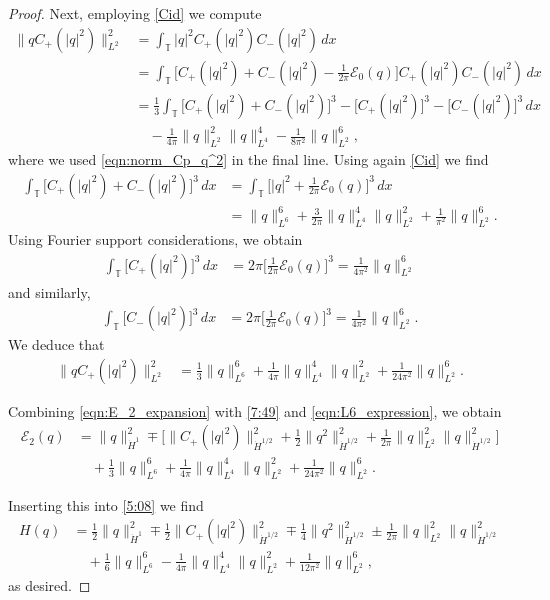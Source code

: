 \documentclass{amsart}
\numberwithin{equation}{section}
\theoremstyle{definition}
\newcommand{\T}{\mathbb{T}}
\begin{document}
\begin{proof}
Next, employing \eqref{Cid} we compute
\begin{align*}
\|q C_+(|q|^2)\|^2_{L^2}
&=\int_\T |q|^2 C_+(|q|^2)C_-(|q|^2)\,dx\\
&=\int_\T  \bigl[C_+(|q|^2)+C_-(|q|^2) -\tfrac1{2\pi} \mathcal{E}_0(q)\bigr]C_+(|q|^2)C_-(|q|^2)\,dx\\
&=\tfrac{1}{3}\int_\T\bigl[C_+(|q|^2)+C_-(|q|^2)\bigr]^3-\bigl[ C_+(|q|^2)\bigr]^3-\bigl[C_-(|q|^2)\bigr]^3\,dx\\
&\quad-\tfrac1{4\pi}\|q\|_{L^2}^2\|q\|_{L^4}^4-\tfrac1{8\pi^2}\|q\|_{L^2}^6,
\end{align*}
where we used \eqref{eqn:norm_Cp_q^2} in the final line.  Using again \eqref{Cid} we find
\begin{align*}
\int_\T\bigl[C_+(|q|^2)+C_-(|q|^2)\bigr]^3\,dx
&=\int_\T\bigl[|q|^2+\tfrac1{2\pi}\mathcal{E}_0(q)\bigr]^3\,dx\\
&=\|q\|_{L^6}^6+\tfrac3{2\pi}\|q\|_{L^4}^4\|q\|_{L^2}^2+\tfrac{1}{\pi^2}\|q\|_{L^2}^6.
\end{align*}
Using Fourier support considerations, we obtain
\begin{align*}
\int_\T\bigl[ C_+(|q|^2)\bigr]^3\,dx&=2\pi\bigl[\tfrac{1}{2\pi}\mathcal{E}_0(q)\bigr]^3=\tfrac{1}{4\pi^2} \|q\|_{L^2}^6
\end{align*}
and similarly,
\begin{align*}
\int_\T\bigl[ C_-(|q|^2)\bigr]^3\,dx&=2\pi\bigl[\tfrac{1}{2\pi}\mathcal{E}_0(q)\bigr]^3=\tfrac{1}{4\pi^2} \|q\|_{L^2}^6.
\end{align*}
We deduce that
\begin{align}
\|q C_+(|q|^2)\|^2_{L^2}
&=\tfrac{1}{3}\|q\|_{L^6}^6+\tfrac1{4\pi}\|q\|_{L^4}^4\|q\|_{L^2}^2+\tfrac{1}{24\pi^2}\|q\|_{L^2}^6.\label{eqn:L6_expression}
\end{align}

Combining \eqref{eqn:E_2_expansion} with \eqref{7:49} and \eqref{eqn:L6_expression}, we obtain 
\begin{align}
\mathcal{E}_2(q)&=\|q\|_{\dot{H}^{1}}^2\mp\bigl[\| C_+(|q|^2)\|_{\dot{H}^{1/2}}^2+\tfrac12\|q^2\|_{\dot{H}^{1/2}}^2+\tfrac1{2\pi}\|q\|_{L^2}^2\|q\|_{\dot{H}^{1/2}}^2\bigr]\nonumber\\
&\quad+\tfrac{1}{3}\|q\|_{L^6}^6+\tfrac1{4\pi}\|q\|_{L^4}^4\|q\|_{L^2}^2+\tfrac{1}{24\pi^2}\|q\|_{L^2}^6.\label{eqn:E2}
\end{align}

Inserting this into \eqref{5:08} we find
\begin{align*}
H(q)&= \tfrac12\|q\|_{\dot{H}^{1}}^2\mp\tfrac12\| C_+(|q|^2)\|_{\dot{H}^{1/2}}^2\mp\tfrac14\|q^2\|_{\dot{H}^{1/2}}^2\pm \tfrac1{2\pi}\|q\|_{L^2}^2\|q\|_{\dot{H}^{1/2}}^2\\
&\quad+\tfrac{1}{6}\|q\|_{L^6}^6-\tfrac1{4\pi}\|q\|_{L^4}^4\|q\|_{L^2}^2+\tfrac{1}{12\pi^2}\|q\|_{L^2}^6,
\end{align*}
as desired.
\end{proof}
\end{document}
